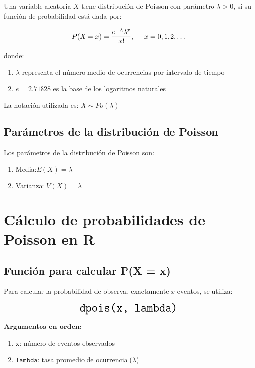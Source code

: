 \documentclass[
  spanish,
  letterpaper,
]{book}
\begin{document}
Una variable aleatoria \(X\) tiene distribución de Poisson con parámetro
\(\lambda > 0\), si su función de probabilidad está dada por:

\[\Large P(X = x) = \frac{e^{-\lambda} \lambda^x}{x!}, \quad x = 0,1,2,\ldots  \]

donde:

\begin{enumerate}
\def\labelenumi{\arabic{enumi}.}
\item
  \(\lambda\) representa el número medio de ocurrencias por intervalo de
  tiempo
\item
  \(e = 2.71828\) es la base de los logaritmos naturales
\end{enumerate}

La notación utilizada es: \(X \sim Po(\lambda)\)

\subsection{Parámetros de la distribución de
Poisson}\label{paruxe1metros-de-la-distribuciuxf3n-de-poisson}

Los parámetros de la distribución de Poisson son:

\begin{enumerate}
\def\labelenumi{\arabic{enumi}.}
\item
  Media:\(E(X) = \lambda\)
\item
  Varianza: \(V(X) = \lambda\)
\end{enumerate}

\section{Cálculo de probabilidades de Poisson en
R}\label{cuxe1lculo-de-probabilidades-de-poisson-en-r}

\subsection{Función para calcular P(X =
x)}\label{funciuxf3n-para-calcular-px-x-1}

Para calcular la probabilidad de observar exactamente \(x\) eventos, se
utiliza:

\[\LARGE \texttt{dpois(x, lambda)}\]

\textbf{Argumentos en orden:}

\begin{enumerate}
\def\labelenumi{\arabic{enumi}.}
\item
  \(\texttt{x}\): número de eventos observados
\item
  \(\texttt{lambda}\): tasa promedio de ocurrencia (\(\lambda\))
\end{enumerate}
\end{document}
